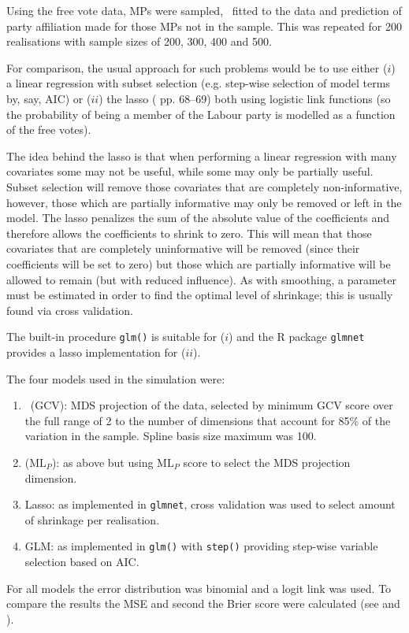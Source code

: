 Using the free vote data, MPs were sampled, \mdsds\ fitted to the data and prediction of party affiliation made for those MPs not in the sample. This was repeated for 200 realisations with sample sizes of 200, 300, 400 and 500.

For comparison, the usual approach for such problems would be to use either ($i$) a linear regression with subset selection (e.g. step-wise selection of model terms by, say, AIC) or ($ii$) the lasso (\cite{elements} pp. 68--69) both using logistic link functions (so the probability of being a member of the Labour party is modelled as a function of the free votes). 

The idea behind the lasso is that when performing a linear regression with many covariates some may not be useful, while some may only be partially useful. Subset selection will remove those covariates that are completely non-informative, however, those which are partially informative may only be removed or left in the model. The lasso penalizes the sum of the absolute value of the coefficients and therefore allows the coefficients to shrink to zero. This will mean that those covariates that are completely uninformative will be removed (since their coefficients will be set to zero) but those which are partially informative will be allowed to remain (but with reduced influence). As with smoothing, a parameter must be estimated in order to find the optimal level of shrinkage; this is usually found via cross validation. 

The built-in procedure \texttt{glm()} is suitable for ($i$) and the \textsf{R} package \texttt{glmnet} provides a lasso implementation for ($ii$).

The four models used in the simulation were:
\begin{enumerate}
	\item \mdsds\ (GCV): MDS projection of the data, selected by minimum GCV score over the full range of 2 to the number of dimensions that account for 85\% of the variation in the sample. Spline basis size maximum was 100.
	\item \mdsds\: ($\text{ML}_P$): as above but using $\text{ML}_P$ score to select the MDS projection dimension.
	\item Lasso: as implemented in \texttt{glmnet}, cross validation was used to select amount of shrinkage per realisation.
	\item GLM: as implemented in \texttt{glm()} with \texttt{step()} providing step-wise variable selection based on AIC.
\end{enumerate}
For all models the error distribution was binomial and a logit link was used. To compare the results the MSE and second the Brier score were calculated (see  and ).

